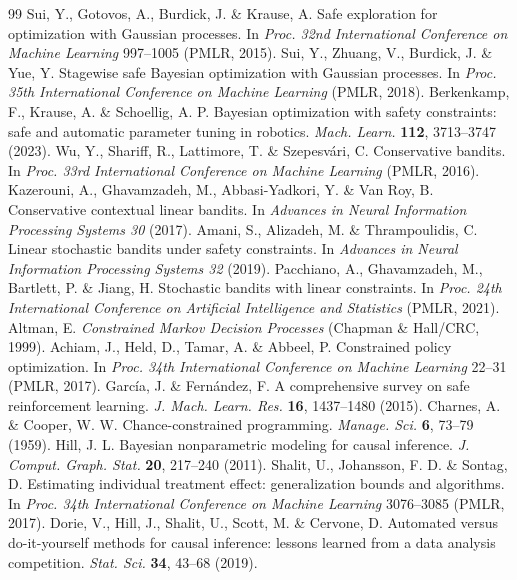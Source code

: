 \documentclass[10pt,a4paper]{article}
\begin{document}
{\footnotesize\setlength{\itemsep}{0pt}\setlength{\parskip}{0pt}
\begin{thebibliography}{99}
 Sui, Y., Gotovos, A., Burdick, J. \& Krause, A. Safe exploration for optimization with Gaussian processes. In \emph{Proc. 32nd International Conference on Machine Learning} 997--1005 (PMLR, 2015).
 Sui, Y., Zhuang, V., Burdick, J. \& Yue, Y. Stagewise safe Bayesian optimization with Gaussian processes. In \emph{Proc. 35th International Conference on Machine Learning} (PMLR, 2018).
 Berkenkamp, F., Krause, A. \& Schoellig, A. P. Bayesian optimization with safety constraints: safe and automatic parameter tuning in robotics. \emph{Mach. Learn.} \textbf{112}, 3713--3747 (2023).
 Wu, Y., Shariff, R., Lattimore, T. \& Szepesv\'ari, C. Conservative bandits. In \emph{Proc. 33rd International Conference on Machine Learning} (PMLR, 2016).
 Kazerouni, A., Ghavamzadeh, M., Abbasi-Yadkori, Y. \& Van Roy, B. Conservative contextual linear bandits. In \emph{Advances in Neural Information Processing Systems 30} (2017).
 Amani, S., Alizadeh, M. \& Thrampoulidis, C. Linear stochastic bandits under safety constraints. In \emph{Advances in Neural Information Processing Systems 32} (2019).
 Pacchiano, A., Ghavamzadeh, M., Bartlett, P. \& Jiang, H. Stochastic bandits with linear constraints. In \emph{Proc. 24th International Conference on Artificial Intelligence and Statistics} (PMLR, 2021).
 Altman, E. \emph{Constrained Markov Decision Processes} (Chapman \& Hall/CRC, 1999).
 Achiam, J., Held, D., Tamar, A. \& Abbeel, P. Constrained policy optimization. In \emph{Proc. 34th International Conference on Machine Learning} 22--31 (PMLR, 2017).
 Garc\'ia, J. \& Fern\'andez, F. A comprehensive survey on safe reinforcement learning. \emph{J. Mach. Learn. Res.} \textbf{16}, 1437--1480 (2015).
 Charnes, A. \& Cooper, W. W. Chance-constrained programming. \emph{Manage. Sci.} \textbf{6}, 73--79 (1959).
 Hill, J. L. Bayesian nonparametric modeling for causal inference. \emph{J. Comput. Graph. Stat.} \textbf{20}, 217--240 (2011).
 Shalit, U., Johansson, F. D. \& Sontag, D. Estimating individual treatment effect: generalization bounds and algorithms. In \emph{Proc. 34th International Conference on Machine Learning} 3076--3085 (PMLR, 2017).
 Dorie, V., Hill, J., Shalit, U., Scott, M. \& Cervone, D. Automated versus do-it-yourself methods for causal inference: lessons learned from a data analysis competition. \emph{Stat. Sci.} \textbf{34}, 43--68 (2019).

\end{thebibliography}}
\end{document}
